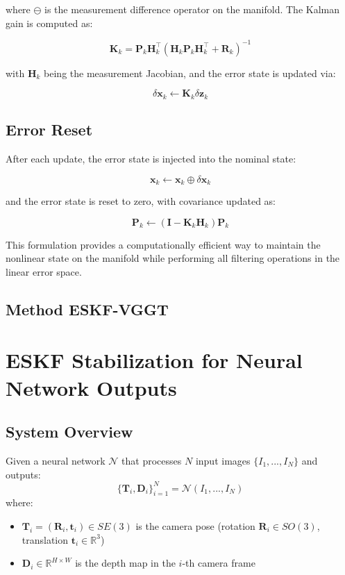 where $\ominus$ is the measurement difference operator on the manifold. The Kalman gain is computed as:

\begin{equation}
	\mathbf{K}_k = \mathbf{P}_k\mathbf{H}_k^\top(\mathbf{H}_k\mathbf{P}_k\mathbf{H}_k^\top + \mathbf{R}_k)^{-1}
\end{equation}

with $\mathbf{H}_k$ being the measurement Jacobian, and the error state is updated via:

\begin{equation}
	\delta\mathbf{x}_k \leftarrow \mathbf{K}_k\delta\mathbf{z}_k
\end{equation}

\subsection{Error Reset}
After each update, the error state is injected into the nominal state:

\begin{equation}
	\mathbf{x}_k \leftarrow \mathbf{x}_k \oplus \delta\mathbf{x}_k
\end{equation}

and the error state is reset to zero, with covariance updated as:

\begin{equation}
	\mathbf{P}_k \leftarrow (\mathbf{I} - \mathbf{K}_k\mathbf{H}_k)\mathbf{P}_k
\end{equation}

This formulation provides a computationally efficient way to maintain the nonlinear state on the manifold while performing all filtering operations in the linear error space.

\subsection{Method ESKF-VGGT}

\section{ESKF Stabilization for Neural Network Outputs}
\subsection{System Overview}
Given a neural network $\mathcal{N}$ that processes $N$ input images $\{I_1,...,I_N\}$ and outputs:
\begin{equation}
	\{\mathbf{T}_i,\mathbf{D}_i\}_{i=1}^N = \mathcal{N}(I_1,...,I_N)
\end{equation}
where:
\begin{itemize}
	\item $\mathbf{T}_i = (\mathbf{R}_i,\mathbf{t}_i) \in SE(3)$ is the camera pose (rotation $\mathbf{R}_i \in SO(3)$, translation $\mathbf{t}_i \in \mathbb{R}^3$)
	\item $\mathbf{D}_i \in \mathbb{R}^{H\times W}$ is the depth map in the $i$-th camera frame
\end{itemize}


